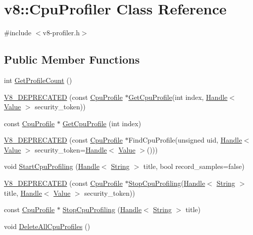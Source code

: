 \hypertarget{classv8_1_1_cpu_profiler}{}\section{v8\+:\+:Cpu\+Profiler Class Reference}
\label{classv8_1_1_cpu_profiler}


{\ttfamily \#include $<$v8-\/profiler.\+h$>$}

\subsection*{Public Member Functions}
\begin{DoxyCompactItemize}
\item 
int \hyperlink{classv8_1_1_cpu_profiler_af49a7c17dfdb194c8bbe2351519575d7}{Get\+Profile\+Count} ()
\item 
\hyperlink{classv8_1_1_cpu_profiler_a2d759506819d40faca9faf05b8997ce7}{V8\+\_\+\+D\+E\+P\+R\+E\+C\+A\+T\+E\+D} (const \hyperlink{classv8_1_1_cpu_profile}{Cpu\+Profile} $\ast$\hyperlink{classv8_1_1_cpu_profiler_a9f5b321b225ec9941290207cdd880ffb}{Get\+Cpu\+Profile}(int index, \hyperlink{classv8_1_1_handle}{Handle}$<$ \hyperlink{classv8_1_1_value}{Value} $>$ security\+\_\+token))
\item 
const \hyperlink{classv8_1_1_cpu_profile}{Cpu\+Profile} $\ast$ \hyperlink{classv8_1_1_cpu_profiler_a9f5b321b225ec9941290207cdd880ffb}{Get\+Cpu\+Profile} (int index)
\item 
\hyperlink{classv8_1_1_cpu_profiler_a2b83d2a89f2d59e8ab345d24dd0772ad}{V8\+\_\+\+D\+E\+P\+R\+E\+C\+A\+T\+E\+D} (const \hyperlink{classv8_1_1_cpu_profile}{Cpu\+Profile} $\ast$Find\+Cpu\+Profile(unsigned uid, \hyperlink{classv8_1_1_handle}{Handle}$<$ \hyperlink{classv8_1_1_value}{Value} $>$ security\+\_\+token=\hyperlink{classv8_1_1_handle}{Handle}$<$ \hyperlink{classv8_1_1_value}{Value} $>$()))
\item 
void \hyperlink{classv8_1_1_cpu_profiler_a61b2b49010708f0283c1613e2bdc1adc}{Start\+Cpu\+Profiling} (\hyperlink{classv8_1_1_handle}{Handle}$<$ \hyperlink{classv8_1_1_string}{String} $>$ title, bool record\+\_\+samples=false)
\item 
\hyperlink{classv8_1_1_cpu_profiler_a5ea4bcc88636e9fa6353d97527ee8a25}{V8\+\_\+\+D\+E\+P\+R\+E\+C\+A\+T\+E\+D} (const \hyperlink{classv8_1_1_cpu_profile}{Cpu\+Profile} $\ast$\hyperlink{classv8_1_1_cpu_profiler_a531059626e708481ecb721a41a82a016}{Stop\+Cpu\+Profiling}(\hyperlink{classv8_1_1_handle}{Handle}$<$ \hyperlink{classv8_1_1_string}{String} $>$ title, \hyperlink{classv8_1_1_handle}{Handle}$<$ \hyperlink{classv8_1_1_value}{Value} $>$ security\+\_\+token))
\item 
const \hyperlink{classv8_1_1_cpu_profile}{Cpu\+Profile} $\ast$ \hyperlink{classv8_1_1_cpu_profiler_a531059626e708481ecb721a41a82a016}{Stop\+Cpu\+Profiling} (\hyperlink{classv8_1_1_handle}{Handle}$<$ \hyperlink{classv8_1_1_string}{String} $>$ title)
\item 
void \hyperlink{classv8_1_1_cpu_profiler_a73bc2fff59e78276025772a8380dc2ab}{Delete\+All\+Cpu\+Profiles} ()
\end{DoxyCompactItemize}


